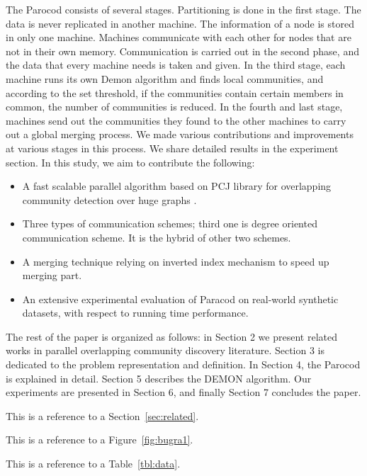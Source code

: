 The Parocod consists of several stages. Partitioning is done in the first stage. The data is never replicated in another machine. The information of a node is stored in only one machine. Machines communicate with each other for nodes that are not in their own memory. Communication is carried out in the second phase, and the data that every machine needs is taken and given. In the third stage, each machine runs its own Demon algorithm and finds local communities, and according to the set threshold, if the communities contain certain members in common, the number of communities is reduced. In the fourth and last stage, machines send out the communities they found to the other machines to carry out a global merging process. We made various contributions and improvements at various stages in this process. We share detailed results in the experiment section. 
In this study, we aim to contribute the following:
\begin{itemize}
 \item A fast scalable parallel algorithm based on PCJ library for overlapping community detection over huge graphs .
 \item Three types of communication schemes; third one is degree oriented communication scheme. It is the hybrid of other two schemes. 
\item A merging technique relying on inverted index mechanism to speed up merging part.
 \item An extensive experimental evaluation of Paracod on real-world synthetic datasets, with respect to running time performance.
 \end{itemize}
The rest of the paper is organized as follows: in Section 2 we present related works in parallel overlapping community discovery literature. Section 3 is dedicated to the problem representation and deﬁnition. In Section 4, the Parocod is explained in detail. Section 5 describes the DEMON algorithm. Our experiments are presented in Section 6, and ﬁnally Section 7 concludes the paper.

This is a reference to a Section~\ref{sec:related}.

This is a reference to a Figure~\ref{fig:bugra1}.

This is a reference to a Table~\ref{tbl:data}.



